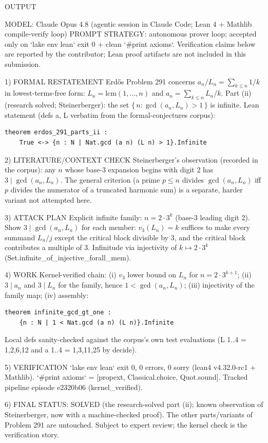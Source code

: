 
OUTPUT

MODEL: Claude Opus 4.8 (agentic session in Claude Code; Lean 4 + Mathlib compile-verify loop)
PROMPT STRATEGY: autonomous prover loop; accepted only on `lake env lean` exit 0 + clean
`#print axioms`. Verification claims below are reported by the contributor;
Lean proof artifacts are not included in this submission.

1) FORMAL RESTATEMENT
Erdős Problem 291 concerns $a_n/L_n = \sum_{k\le n} 1/k$ in lowest-terms-free form:
$L_n = \mathrm{lcm}(1,\dots,n)$ and $a_n = \sum_{k\le n} L_n/k$. Part (ii)
(research solved; Steinerberger): the set $\{\,n : \gcd(a_n, L_n) > 1\,\}$ is infinite.
Lean statement (defs a, L verbatim from the formal-conjectures corpus):
\begin{verbatim}
theorem erdos_291_parts_ii :
    True <-> {n : N | Nat.gcd (a n) (L n) > 1}.Infinite
\end{verbatim}

2) LITERATURE/CONTEXT CHECK
Steinerberger's observation (recorded in the corpus): any $n$ whose base-3 expansion
begins with digit 2 has $3 \mid \gcd(a_n, L_n)$. The general criterion (a prime
$p \le n$ divides $\gcd(a_n,L_n)$ iff $p$ divides the numerator of a truncated harmonic
sum) is a separate, harder variant not attempted here.

3) ATTACK PLAN
Explicit infinite family: $n = 2\cdot 3^k$ (base-3 leading digit 2). Show
$3 \mid \gcd(a_n, L_n)$ for each member: $v_3(L_n) = k$ suffices to make every summand
$L_n/j$ except the critical block divisible by 3, and the critical block contributes a
multiple of 3. Infinitude via injectivity of $k \mapsto 2\cdot3^k$
(Set.infinite_of_injective_forall_mem).

4) WORK
Kernel-verified chain: (i) $v_3$ lower bound on $L_n$ for $n = 2\cdot3^{k+1}$;
(ii) $3 \mid a_n$ and $3 \mid L_n$ for the family, hence
$1 < \gcd(a_n, L_n)$; (iii) injectivity of the family map; (iv) assembly:
\begin{verbatim}
theorem infinite_gcd_gt_one :
    {n : N | 1 < Nat.gcd (a n) (L n)}.Infinite
\end{verbatim}
Local defs sanity-checked against the corpus's own test evaluations
(L 1..4 = 1,2,6,12 and a 1..4 = 1,3,11,25 by decide).

5) VERIFICATION
`lake env lean` exit 0, 0 errors, 0 sorry (lean4 v4.32.0-rc1 + Mathlib).
`#print axioms` = [propext, Classical.choice, Quot.sound].
Tracked pipeline episode e2320b06 (kernel_verified).

6) FINAL STATUS: SOLVED (the research-solved part (ii); known observation of
Steinerberger, now with a machine-checked proof). The other parts/variants of
Problem 291 are untouched. Subject to expert review; the kernel check is the
verification story.
